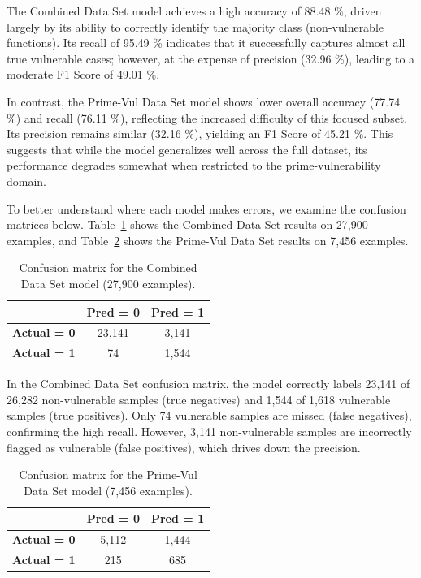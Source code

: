 \documentclass{article}
\begin{document}
The Combined Data Set model achieves a high accuracy of 88.48 \%, driven largely by its ability to correctly identify the majority class (non-vulnerable functions). Its recall of 95.49 \% indicates that it successfully captures almost all true vulnerable cases; however, at the expense of precision (32.96 \%), leading to a moderate F1 Score of 49.01 \%.  

In contrast, the Prime-Vul Data Set model shows lower overall accuracy (77.74 \%) and recall (76.11 \%), reflecting the increased difficulty of this focused subset. Its precision remains similar (32.16 \%), yielding an F1 Score of 45.21 \%. This suggests that while the model generalizes well across the full dataset, its performance degrades somewhat when restricted to the prime-vulnerability domain.

To better understand where each model makes errors, we examine the confusion matrices below. Table~\ref{tab:confmat-large} shows the Combined Data Set results on 27,900 examples, and Table~\ref{tab:confmat-small} shows the Prime-Vul Data Set results on 7,456 examples.

\begin{table}[ht]
  \centering
  \begin{tabular}{c|cc}
    & \textbf{Pred = 0} & \textbf{Pred = 1} \\ \hline
  \textbf{Actual = 0} & 23,141 & 3,141 \\
  \textbf{Actual = 1} &    74  & 1,544 \\
  \end{tabular}
  \caption{Confusion matrix for the Combined Data Set model (27,900 examples).}
  \label{tab:confmat-large}
\end{table}

\pagebreak

In the Combined Data Set confusion matrix, the model correctly labels 23,141 of 26,282 non-vulnerable samples (true negatives) and 1,544 of 1,618 vulnerable samples (true positives). Only 74 vulnerable samples are missed (false negatives), confirming the high recall. However, 3,141 non-vulnerable samples are incorrectly flagged as vulnerable (false positives), which drives down the precision.

\begin{table}[ht]
  \centering
  \begin{tabular}{c|cc}
    & \textbf{Pred = 0} & \textbf{Pred = 1} \\ \hline
  \textbf{Actual = 0} & 5,112 & 1,444 \\
  \textbf{Actual = 1} &  215  &   685 \\
  \end{tabular}
  \caption{Confusion matrix for the Prime-Vul Data Set model (7,456 examples).}
  \label{tab:confmat-small}
\end{table}
\end{document}
